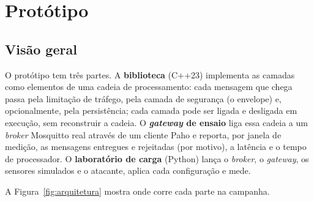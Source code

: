 \section{Protótipo}
\label{sec:prototipo}

\subsection{Visão geral}

O protótipo tem três partes. A \textbf{biblioteca} (C++23) implementa as camadas
como elementos de uma cadeia de processamento: cada mensagem que chega passa pela
limitação de tráfego, pela camada de segurança (o envelope) e, opcionalmente, pela
persistência; cada camada pode ser ligada e desligada em execução, sem reconstruir
a cadeia. O \textbf{\emph{gateway} de ensaio} liga essa cadeia a um \emph{broker}
Mosquitto real através de um cliente Paho e reporta, por janela de medição, as
mensagens entregues e rejeitadas (por motivo), a latência e o tempo de processador.
O \textbf{laboratório de carga} (Python) lança o \emph{broker}, o \emph{gateway},
os sensores simulados e o atacante, aplica cada configuração e mede.

A Figura~\ref{fig:arquitetura} mostra onde corre cada parte na campanha.

